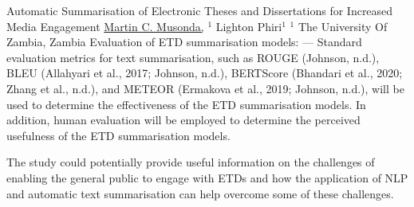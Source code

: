 \begin{abstract_online}{Automatic Summarisation of Electronic Theses and Dissertations for Increased Media Engagement}{%
    \underline{Martin C. Musonda,} $^{1}$ Lighton Phiri$^{1}$}{%
    }{%
    $^1$ The University Of Zambia, Zambia}
Evaluation of ETD summarisation models: — Standard evaluation metrics for text summarisation, such as ROUGE (Johnson, n.d.), BLEU (Allahyari et al., 2017; Johnson, n.d.), BERTScore (Bhandari et al., 2020; Zhang et al., n.d.), and METEOR (Ermakova et al., 2019; Johnson, n.d.), will be used to determine the effectiveness of the ETD summarisation models. In addition, human evaluation will be employed to determine the perceived usefulness of the ETD summarisation models.

The study could potentially provide useful information on the challenges of enabling the general public to engage with ETDs and how the application of NLP and automatic text summarisation can help overcome some of these challenges.

\end{abstract_online}

